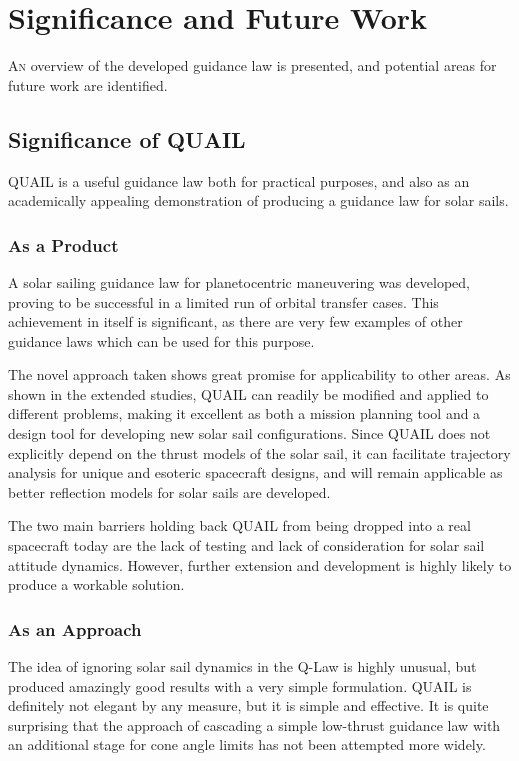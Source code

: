 \chapter{Significance and Future Work}

\lettrine{A}{n} overview of the developed guidance law is presented, and potential areas for future work are identified.

\section{Significance of QUAIL}
QUAIL is a useful guidance law both for practical purposes, and also as an academically appealing demonstration of producing a guidance law for solar sails.

\subsection{As a Product}
A solar sailing guidance law for planetocentric maneuvering was developed, proving to be successful in a limited run of orbital transfer cases. This achievement in itself is significant, as there are very few examples of other guidance laws which can be used for this purpose.

The novel approach taken shows great promise for applicability to other areas. As shown in the extended studies, QUAIL can readily be modified and applied to different problems, making it excellent as both a mission planning tool and a design tool for developing new solar sail configurations. Since QUAIL does not explicitly depend on the thrust models of the solar sail, it can facilitate trajectory analysis for unique and esoteric spacecraft designs, and will remain applicable as better reflection models for solar sails are developed.

The two main barriers holding back QUAIL from being dropped into a real spacecraft today are the lack of testing and lack of consideration for solar sail attitude dynamics. However, further extension and development is highly likely to produce a workable solution.

\subsection{As an Approach}
The idea of ignoring solar sail dynamics in the Q-Law is highly unusual, but produced amazingly good results with a very simple formulation. QUAIL is definitely not elegant by any measure, but it is simple and effective. It is quite surprising that the approach of cascading a simple low-thrust guidance law with an additional stage for cone angle limits has not been attempted more widely.


